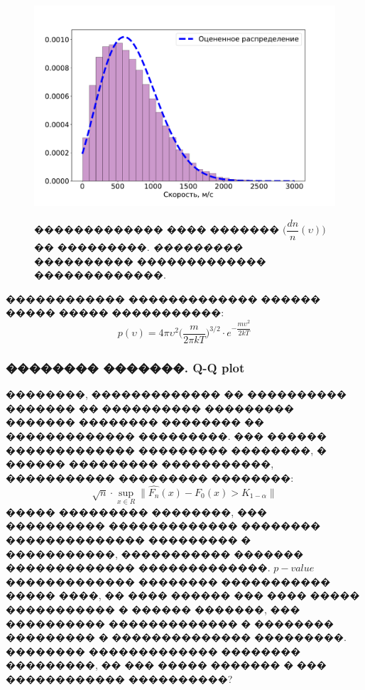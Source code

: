\begin{figure}[!h]
{\includegraphics[width=1\linewidth]{hist_v}}
    \caption{������������� ���� ������� $\Big(\dfrac{dn}{n} (\upsilon) \Big)$ �� ���������. \textit{���������} ���������� ������������� �������������. }
\end{figure}

\indent ������������ ������������� ������ ����� ����� �����������:
\begin{equation}
    p(\upsilon) = 4\pi\upsilon^2 \Big( \dfrac{m}{2\pi kT} \Big)^{3/2}\cdot e^{-\dfrac{m \upsilon^2}{2kT}}
\end{equation}

\subsubsection{�������� �������. Q-Q plot}
��������, ������������� �� ���������� ������� �� ���������� ��������� ������� �������� �������� �� ������������� ���������. ��� ������ ������������� ��������� ��������,
� ������ ��������� �����������, ����������� ��������� ��������:
\[\sqrt{n} \cdot \sup\limits_{x \in R}{ \| \hat{F_n}(x)- F_0(x)} > K_{1-\alpha} \| \]
����� ��������� ��������, ��� ���������� ������������� �������� �������������� ��������� � �����������, ����������� ������� ������������� �������������. $p-value$ ������������� ��������
����������� ����� ����, �� ���� ������ ��� ���� ����� ����������� � ������ �������, ��� ���������� ������������� � �������� ��������� � �������������� ���������. �������� ������������� �������� ���������,
�� ��� ����� ������� � ��� ������������ ����������?


